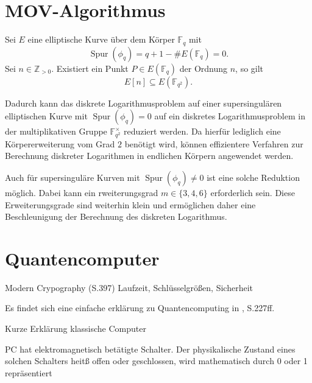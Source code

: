 
\section{MOV-Algorithmus}
\begin{lemma}
    Sei $E$ eine elliptische Kurve über dem Körper $\mathbb{F}_q$ mit
    \[
        \operatorname{Spur}(\phi_q)
        = q+1-\#E(\mathbb{F}_q)=0.
    \]
    Sei $n\in\mathbb{Z}_{>0}$. Existiert ein Punkt
    $P\in E(\mathbb{F}_q)$ der Ordnung $n$, so gilt
    \[
        E[n]\subseteq E(\mathbb{F}_{q^2}).
    \]
\end{lemma}

Dadurch kann das diskrete Logarithmusproblem auf einer supersingulären elliptischen Kurve mit $\operatorname{Spur}(\phi_q)=0$ auf ein diskretes Logarithmusproblem in der multiplikativen Gruppe $\mathbb{F}_{q^2}^{\times}$ reduziert werden. Da hierfür lediglich eine
Körpererweiterung vom Grad $2$ benötigt wird, können effizientere Verfahren zur Berechnung diskreter Logarithmen in endlichen Körpern
angewendet werden.

Auch für supersinguläre Kurven mit $\operatorname{Spur}(\phi_q)\neq 0$ ist eine solche Reduktion möglich. Dabei kann ein rweiterungsgrad $m\in\{3,4,6\}$ erforderlich sein. Diese Erweiterungsgrade sind weiterhin klein und ermöglichen daher eine Beschleunigung der Berechnung des diskreten Logarithmus.


\section{Quantencomputer}

Modern Crypography (S.397)
Laufzeit, Schlüsselgrößen, Sicherheit

Es findet sich eine einfache erklärung zu Quantencomputing in \cite{buell24}, S.227ff.

Kurze Erklärung klassische Computer 

PC hat elektromagnetisch betätigte Schalter. Der physikalische Zustand eines solchen Schalters heitß offen oder geschlossen, wird mathematisch durch 0 oder 1 repräsentiert





